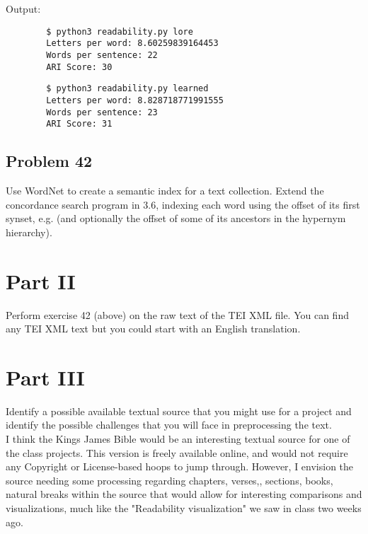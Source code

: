 \documentclass[12pt]{article}
\begin{document}
		
		Output:\\
		\begin{lstlisting}
		$ python3 readability.py lore
		Letters per word: 8.60259839164453
		Words per sentence: 22
		ARI Score: 30
		\end{lstlisting}
		
		\begin{lstlisting}
		$ python3 readability.py learned
		Letters per word: 8.828718771991555
		Words per sentence: 23
		ARI Score: 31
		\end{lstlisting}
		
		
		\subsection*{Problem 42}
		Use WordNet to create a semantic index for a text collection. Extend the concordance search program in 3.6, indexing each word using the offset of its first synset, e.g.  (and optionally the offset of some of its ancestors in the hypernym hierarchy).
		
	\section*{Part II}


	Perform exercise 42 (above) on the raw text of the TEI XML file. You can find any TEI XML text but you could start with an English translation. 
	
	\section*{Part III}
	 Identify a possible available textual source that you might use for a project and identify the possible challenges that you will face in preprocessing the text. \\
	 
	 I think the Kings James Bible would be an interesting textual source for one of the class projects. This version is freely available online, and would not require any Copyright or License-based hoops to jump through. However, I envision the source needing some processing regarding chapters, verses,, sections, books, natural breaks within the source that would allow for interesting comparisons and visualizations, much like the "Readability visualization" we saw in class two weeks ago.
	
\end{document}

